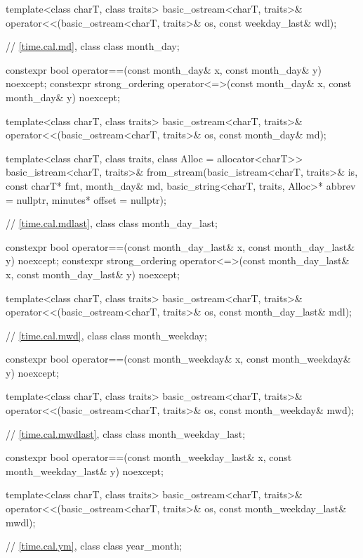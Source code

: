 \begin{codeblock}
{  template<class charT, class traits>
    basic_ostream<charT, traits>&
      operator<<(basic_ostream<charT, traits>& os, const weekday_last& wdl);

  // \ref{time.cal.md}, class 
  class month_day;

  constexpr bool operator==(const month_day& x, const month_day& y) noexcept;
  constexpr strong_ordering operator<=>(const month_day& x, const month_day& y) noexcept;

  template<class charT, class traits>
    basic_ostream<charT, traits>&
      operator<<(basic_ostream<charT, traits>& os, const month_day& md);

  template<class charT, class traits, class Alloc = allocator<charT>>
    basic_istream<charT, traits>&
      from_stream(basic_istream<charT, traits>& is, const charT* fmt,
                  month_day& md, basic_string<charT, traits, Alloc>* abbrev = nullptr,
                  minutes* offset = nullptr);

  // \ref{time.cal.mdlast}, class 
  class month_day_last;

  constexpr bool operator==(const month_day_last& x, const month_day_last& y) noexcept;
  constexpr strong_ordering operator<=>(const month_day_last& x,
                                        const month_day_last& y) noexcept;

  template<class charT, class traits>
    basic_ostream<charT, traits>&
      operator<<(basic_ostream<charT, traits>& os, const month_day_last& mdl);

  // \ref{time.cal.mwd}, class 
  class month_weekday;

  constexpr bool operator==(const month_weekday& x, const month_weekday& y) noexcept;

  template<class charT, class traits>
    basic_ostream<charT, traits>&
      operator<<(basic_ostream<charT, traits>& os, const month_weekday& mwd);

  // \ref{time.cal.mwdlast}, class 
  class month_weekday_last;

  constexpr bool operator==(const month_weekday_last& x, const month_weekday_last& y) noexcept;

  template<class charT, class traits>
    basic_ostream<charT, traits>&
      operator<<(basic_ostream<charT, traits>& os, const month_weekday_last& mwdl);

  // \ref{time.cal.ym}, class 
  class year_month;

}
\end{codeblock}
